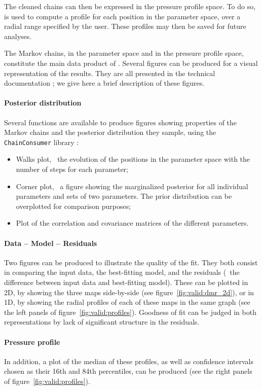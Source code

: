 The cleaned chains can then be expressed in the pressure profile space.
To do so,  is used to compute a profile for each position in the parameter space, over a radial range specified by the user.
These profiles may then be saved for future analyses.

The Markov chains, in the parameter space and in the pressure profile space, constitute the main data product of \panco.
Several figures can be produced for a visual representation of the results.
They are all presented in the technical documentation ; we give here a brief description of these figures.

\paragraph{Posterior distribution}
Several functions are available to produce figures showing properties of the Markov chains and the posterior distribution they sample, using the \texttt{ChainConsumer} library \citep{hinton_chainconsumer_2016}:
\begin{itemize}[leftmargin=*]
    \item Walks plot, \ie\ the evolution of the positions in the parameter space with the number of steps for each parameter;
    \item Corner plot, \ie\ a figure showing the marginalized posterior for all individual parameters and sets of two parameters.
        The prior distribution can be overplotted for comparison purposes;
    \item Plot of the correlation and covariance matrices of the different parameters.
\end{itemize}

\paragraph{Data -- Model -- Residuals}
Two figures can be produced to illustrate the quality of the fit.
They both consist in comparing the input data, the best-fitting model, and the residuals (\ie\ the difference between input data and best-fitting model).
These can be plotted in 2D, by showing the three maps side-by-side (see figure~\ref{fig:valid:dmr_2d}), or in 1D, by showing the radial profiles of each of these maps in the same graph (see the left panels of figure~\ref{fig:valid:profiles}).
Goodness of fit can be judged in both representations by lack of significant structure in the residuals.

\paragraph{Pressure profile}
In addition, a plot of the median of these profiles, as well as confidence intervals chosen as their 16th and 84th percentiles, can be produced (see the right panels of figure~\ref{fig:valid:profiles}).
